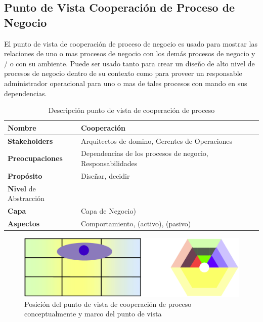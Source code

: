     \subsection{Punto de Vista Cooperación de Proceso de Negocio}
    El punto de vista de cooperación de proceso de negocio es usado para mostrar las relaciones
    de uno o mas procesos de negocio con los demás procesos de negocio y / o con su ambiente. Puede ser usado tanto para crear un diseño de alto nivel de procesos de negocio   dentro de su contexto como para proveer un responsable administrador operacional para uno o mas de tales procesos con mando en sus dependencias. \cite{ref9}
    \begin{table}[h]
      \centering
      \begin{tabular}{p{3.7cm}p{8cm}}
        \hline
        \textbf{Nombre} & \textbf{Cooperación} \\
        \hline
        \textbf{Stakeholders} & Arquitectos de domino, Gerentes de Operaciones \\
        \textbf{Preocupaciones} & Dependencias de los procesos de negocio, Responsabilidades \\
        \textbf{Propósito} & Diseñar, decidir \\
        \textbf{Nivel} de Abstracción \\
        \textbf{Capa} & Capa de Negocio) \\
        \textbf{Aspectos} & Comportamiento, (activo), (pasivo) \\
      \end{tabular}
      \caption{Descripción punto de vista de cooperación de proceso \cite{ref9}}
      \label{tabla8}
    \end{table}
    \begin{figure}[h]
      \centering
      \includegraphics[scale=0.2]{Imagenes/Figuras/18}
      \caption{Posición del punto de vista de cooperación de proceso conceptualmente y marco del punto de vista \cite{ref9}}
      \label{figura18}
    \end{figure}

